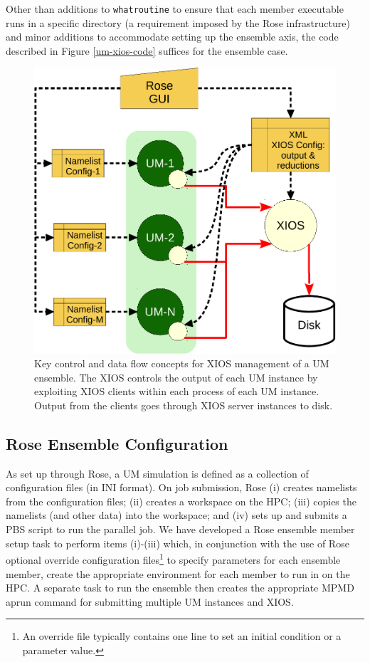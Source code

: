 \documentclass[twocolumn, 12pt]{paper}
\begin{document}
Other than additions to \texttt{whatroutine} to ensure that each member executable runs in a specific directory (a requirement imposed by the Rose infrastructure) and minor additions to accommodate setting up the ensemble axis, the code described in Figure \ref{um-xios-code} suffices for the ensemble case.

\begin{figure}[H]
	\centerline{
	\includegraphics[scale=0.5]{figures/xios_figures_b.pdf}
	}
	\caption {Key control and data flow concepts for XIOS management of a UM ensemble. The XIOS controls	the output of each UM instance by exploiting XIOS clients within each process of each UM instance. Output from the clients goes through	XIOS server instances to disk.}
	\label{fig-xios-layout}
\end{figure}

\subsection{Rose Ensemble Configuration}

As set up through Rose, a UM simulation is defined as a collection of configuration files (in INI format).
On job submission, Rose (i) creates namelists from the configuration files; (ii) creates a workspace on the HPC; (iii) copies the namelists (and other data) into the workspace; and (iv) sets up and submits a PBS script to run the parallel job.
We have developed a Rose ensemble member setup task to perform items (i)-(iii) which, in conjunction with the use of Rose optional override configuration files\footnote{An override file typically contains one line to set an initial condition or a parameter value.} to specify parameters for each ensemble member, create the appropriate environment for each member to run in on the HPC.
A separate task to run the ensemble then creates the appropriate MPMD aprun command for submitting multiple UM instances and XIOS.
\end{document}
